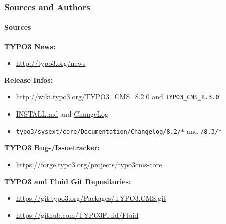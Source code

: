\begin{frame}[fragile]
	\frametitle{Sources and Authors}
	\framesubtitle{Sources}

	\textbf{TYPO3 News:}
		\begin{itemize}\smaller
			\item \url{http://typo3.org/news}
		\end{itemize}

	\textbf{Release Infos:}
		\begin{itemize}\smaller
			\item \url{http://wiki.typo3.org/TYPO3_CMS_8.2.0} and \texttt{\href{http://wiki.typo3.org/TYPO3_CMS_8.2.0}{TYPO3\_CMS\_8.3.0}}
			\item \href{https://github.com/TYPO3/TYPO3.CMS/blob/master/INSTALL.md}{INSTALL.md}
				and \href{https://github.com/TYPO3/TYPO3.CMS/tree/master/typo3/sysext/core/Documentation/Changelog}{ChangeLog}
			\item \texttt{typo3/sysext/core/Documentation/Changelog/8.2/*} and \texttt{/8.3/*}
		\end{itemize}

	\textbf{TYPO3 Bug-/Issuetracker:}
		\begin{itemize}\smaller
			\item \url{https://forge.typo3.org/projects/typo3cms-core}
		\end{itemize}

	\textbf{TYPO3 and Fluid Git Repositories:}
		\begin{itemize}\smaller
			\item \url{https://git.typo3.org/Packages/TYPO3.CMS.git}
			\item \url{https://github.com/TYPO3Fluid/Fluid}
		\end{itemize}

\end{frame}


